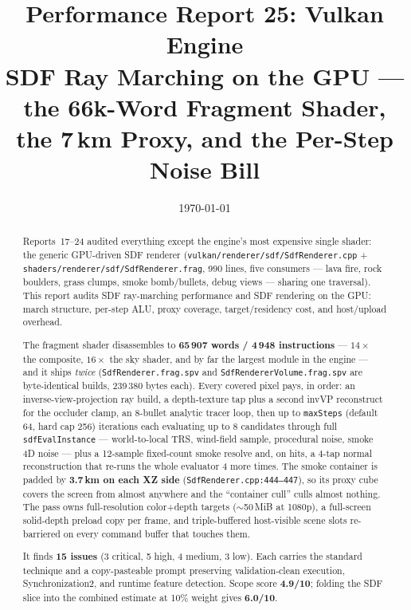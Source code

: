\documentclass[11pt,a4paper]{article}
\title{Performance Report 25: Vulkan Engine \\
\large SDF Ray Marching on the GPU --- the 66k-Word Fragment Shader, the 7\,km Proxy, and the Per-Step Noise Bill}
\author{}
\date{\today}
\begin{document}
\maketitle

\begin{abstract}
Reports~17--24 audited everything except the engine's most expensive single
shader: the generic GPU-driven SDF renderer
(\texttt{vulkan/renderer/sdf/SdfRenderer.cpp} + \texttt{shaders/renderer/sdf/SdfRenderer.frag},
990 lines, five consumers --- lava fire, rock boulders, grass clumps, smoke
bomb/bullets, debug views --- sharing one traversal). This report audits SDF
ray-marching performance and SDF rendering on the GPU: march structure,
per-step ALU, proxy coverage, target/residency cost, and host/upload
overhead.

The fragment shader disassembles to \textbf{65\,907 words / 4\,948
instructions} --- $14\times$ the composite, $16\times$ the sky shader, and by
far the largest module in the engine --- and it ships \emph{twice}
(\texttt{SdfRenderer.frag.spv} and \texttt{SdfRendererVolume.frag.spv} are
byte-identical builds, 239\,380 bytes each). Every covered pixel pays, in
order: an inverse-view-projection ray build, a depth-texture tap plus a second
invVP reconstruct for the occluder clamp, an 8-bullet analytic tracer loop,
then up to \texttt{maxSteps} (default 64, hard cap 256) iterations each
evaluating up to 8 candidates through full \texttt{sdfEvalInstance} ---
world-to-local TRS, wind-field sample, procedural noise, smoke 4D noise ---
plus a 12-sample fixed-count smoke resolve and, on hits, a 4-tap normal
reconstruction that re-runs the whole evaluator 4 more times. The smoke
container is padded by \textbf{3.7\,km on each XZ side}
(\texttt{SdfRenderer.cpp:444--447}), so its proxy cube covers the screen from
almost anywhere and the ``container cull'' culls almost nothing. The pass owns
full-resolution color+depth targets ($\sim$50\,MiB at 1080p), a full-screen
solid-depth preload copy per frame, and triple-buffered host-visible scene
slots re-barriered on every command buffer that touches them.

It finds \textbf{15 issues} (3 critical, 5 high, 4 medium, 3 low). Each
carries the standard technique and a copy-pasteable prompt preserving
validation-clean execution, Synchronization2, and runtime feature detection.
Scope score \textbf{4.9/10}; folding the SDF slice into the combined estimate
at 10\% weight gives \textbf{6.0/10}.
\end{abstract}
\end{document}
